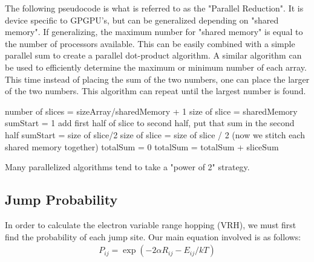 The following pseudocode is what is referred to as the "Parallel Reduction". It is device specific to GPGPU's, but can be generalized depending on "shared memory". If generalizing, the maximum number for "shared memory" is equal to the number of processors available. This can be easily combined with a simple parallel sum to create a parallel dot-product algorithm. A similar algorithm can be used to efficiently determine the maximum or minimum number of each array. This time instead of placing the sum of the two numbers, one can place the larger of the two numbers. This algorithm can repeat until the largest number is found.








\begin{varwidth}{\dimexpr{}\fboxrule\relax}
\begin{algorithmic}[1]
\State number of slices = sizeArray/sharedMemory + 1
\State size of slice = sharedMemory
\State sumStart = 1
\State add first half of slice to second half, put that sum in the second half
\EndFor
\State sumStart = size of slice/2
\State size of slice  = size of slice / 2
\EndFor
\EndFor
\State (now we stitch each shared memory together)
\State totalSum = 0
\State totalSum = totalSum + sliceSum
\EndFor




Many parallelized algorithms tend to take a "power of 2" strategy.
\end{algorithmic}
\end{varwidth}%



\subsection{Jump Probability}

In order to calculate the electron variable range hopping (VRH), we must first find the probability of each jump site. Our main equation involved is as follows:
\begin{eqnarray}
P_{ij} = \exp (-2\alpha R_{ij} -  E_{ij}/kT)
\label{probability}
\end{eqnarray}

